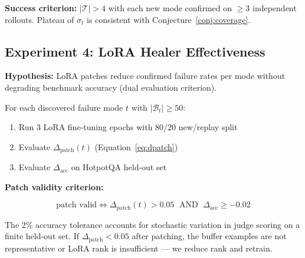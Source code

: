 \documentclass[11pt,a4paper]{article}
\begin{document}
\textbf{Success criterion:} $|\mathcal{T}| > 4$ with each new mode confirmed
on $\geq 3$ independent rollouts. Plateau of $\sigma_t$ is consistent with
Conjecture~\ref{conj:coverage}.

\subsection{Experiment 4: LoRA Healer Effectiveness}

\textbf{Hypothesis:} LoRA patches reduce confirmed failure rates per mode
without degrading benchmark accuracy (dual evaluation criterion).

For each discovered failure mode $t$ with $|\mathcal{B}_t| \geq 50$:

\begin{enumerate}
  \item Run 3 LoRA fine-tuning epochs with 80/20 new/replay split
  \item Evaluate $\Delta_\text{patch}(t)$ (Equation~\ref{eq:dpatch})
  \item Evaluate $\Delta_\text{acc}$ on HotpotQA held-out set
\end{enumerate}

\textbf{Patch validity criterion:}

\begin{equation}
\text{patch valid} \iff \Delta_\text{patch}(t) > 0.05
\;\text{ AND }\;
\Delta_\text{acc} \geq -0.02
\label{eq:patchvalid}
\end{equation}

The 2\% accuracy tolerance accounts for stochastic variation in judge scoring
on a finite held-out set. If $\Delta_\text{patch} < 0.05$ after patching,
the buffer examples are not representative or LoRA rank is insufficient ---
we reduce rank and retrain.

\begin{table}[h]
\centering\small
{}
\caption{LoRA healer effectiveness. TBD entries are filled during experiments.
Patch is valid iff $\Delta_\text{patch} > 0.05$ AND $\Delta_\text{acc} \geq -0.02$.
Columns without replay buffer run as ablation to confirm catastrophic forgetting.}
\label{tab:healer}
\end{table}
\end{document}
